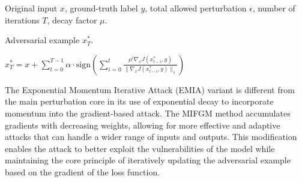 Original input $x$, ground-truth label $y$, total allowed perturbation $\epsilon$, number of iterations $T$, decay factor $\mu$.

Adversarial example $x^*_T$.

$x^*_T = x + \sum_{t=0}^{T-1} \alpha \cdot \text{sign} \left( \sum_{i=0}^{t} \frac{\mu^i \nabla_x J(x^*_{t-i}, y)}{\| \nabla_x J(x^*_{t-i}, y) \|_1} \right)$

The Exponential Momentum Iterative Attack (EMIA) variant is different from the main perturbation core in its use of exponential decay to incorporate momentum into the gradient-based attack. The MIFGM method accumulates gradients with decreasing weights, allowing for more effective and adaptive attacks that can handle a wider range of inputs and outputs. This modification enables the attack to better exploit the vulnerabilities of the model while maintaining the core principle of iteratively updating the adversarial example based on the gradient of the loss function.